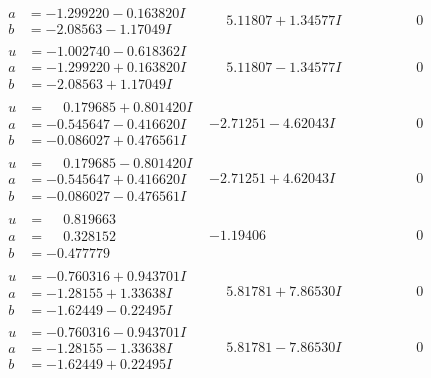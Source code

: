 \documentclass[1p]{elsarticle_modified}
\theoremstyle{definition}
\begin{document}
$$\begin{array}{c|c|c}
\begin{aligned}
a &= -1.299220 - 0.163820 I \\
b &= -2.08563 - 1.17049 I\end{aligned}
 & \phantom{-}5.11807 + 1.34577 I & \phantom{-0.000000 } 0 \\ \hline\begin{aligned}
u &= -1.002740 - 0.618362 I \\
a &= -1.299220 + 0.163820 I \\
b &= -2.08563 + 1.17049 I\end{aligned}
 & \phantom{-}5.11807 - 1.34577 I & \phantom{-0.000000 } 0 \\ \hline\begin{aligned}
u &= \phantom{-}0.179685 + 0.801420 I \\
a &= -0.545647 - 0.416620 I \\
b &= -0.086027 + 0.476561 I\end{aligned}
 & -2.71251 - 4.62043 I & \phantom{-0.000000 } 0 \\ \hline\begin{aligned}
u &= \phantom{-}0.179685 - 0.801420 I \\
a &= -0.545647 + 0.416620 I \\
b &= -0.086027 - 0.476561 I\end{aligned}
 & -2.71251 + 4.62043 I & \phantom{-0.000000 } 0 \\ \hline\begin{aligned}
u &= \phantom{-}0.819663\phantom{ +0.000000I} \\
a &= \phantom{-}0.328152\phantom{ +0.000000I} \\
b &= -0.477779\phantom{ +0.000000I}\end{aligned}
 & -1.19406\phantom{ +0.000000I} & \phantom{-0.000000 } 0 \\ \hline\begin{aligned}
u &= -0.760316 + 0.943701 I \\
a &= -1.28155 + 1.33638 I \\
b &= -1.62449 - 0.22495 I\end{aligned}
 & \phantom{-}5.81781 + 7.86530 I & \phantom{-0.000000 } 0 \\ \hline\begin{aligned}
u &= -0.760316 - 0.943701 I \\
a &= -1.28155 - 1.33638 I \\
b &= -1.62449 + 0.22495 I\end{aligned}
 & \phantom{-}5.81781 - 7.86530 I & \phantom{-0.000000 } 0 \\ \hline\begin{aligned}

\end{aligned}
\end{array}$$
\end{document}
